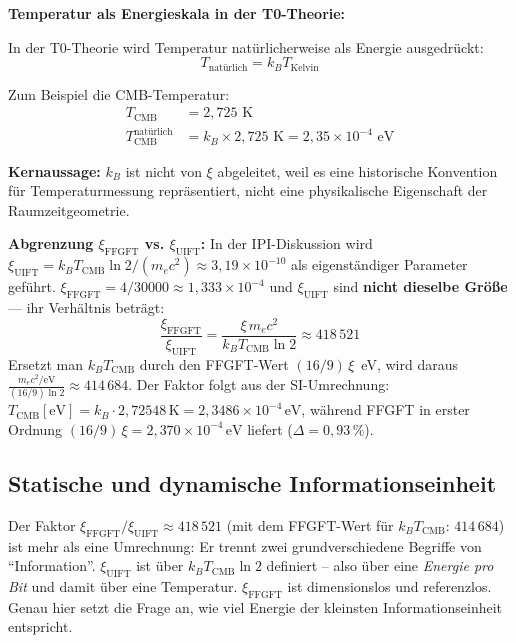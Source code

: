 	\begin{insight}
		\textbf{Temperatur als Energieskala in der T0-Theorie:}
		
		In der T0-Theorie wird Temperatur natürlicherweise als Energie ausgedrückt:
		\begin{equation}
			T_{\text{natürlich}} = k_B T_{\text{Kelvin}}
		\end{equation}
		
		Zum Beispiel die CMB-Temperatur:
		\begin{align}
			T_{\text{CMB}} &= 2{,}725 \text{ K} \\
			T_{\text{CMB}}^{\text{natürlich}} &= k_B \times 2{,}725 \text{ K} = 2{,}35 \times 10^{-4} \text{ eV}
		\end{align}
		
		\textbf{Kernaussage:} $k_B$ ist nicht von $\xi$ abgeleitet, weil es eine historische Konvention für Temperaturmessung repräsentiert, nicht eine physikalische Eigenschaft der Raumzeitgeometrie.

		\textbf{Abgrenzung $\xi_{\text{FFGFT}}$ vs. $\xi_{\text{UIFT}}$:}
		In der IPI-Diskussion wird $\xi_{\text{UIFT}} = k_B T_{\text{CMB}} \ln 2 / (m_e c^2) \approx 3{,}19 \times 10^{-10}$ als eigenständiger Parameter geführt.
		$\xi_{\text{FFGFT}} = 4/30000 \approx 1{,}333 \times 10^{-4}$ und $\xi_{\text{UIFT}}$ sind \textbf{nicht dieselbe Größe} — ihr Verhältnis beträgt:
		\begin{equation}
			\frac{\xi_{\text{FFGFT}}}{\xi_{\text{UIFT}}} = \frac{\xi\, m_e c^2}{k_B T_{\text{CMB}} \ln 2} \approx 418\,521
		\end{equation}
		Ersetzt man $k_B T_{\text{CMB}}$ durch den FFGFT-Wert $(16/9)\,\xi$~eV, wird daraus $\frac{m_e c^2/\text{eV}}{(16/9)\ln 2} \approx 414\,684$.
		Der Faktor folgt aus der SI-Umrechnung: $T_{\text{CMB}}[\text{eV}] = k_B \cdot 2{,}72548\,\text{K} = 2{,}3486 \times 10^{-4}\,\text{eV}$, während FFGFT in erster Ordnung $(16/9)\,\xi = 2{,}370 \times 10^{-4}\,\text{eV}$ liefert ($\Delta = 0{,}93\,\%$).
	\end{insight}

	\subsection{Statische und dynamische Informationseinheit}

	Der Faktor $\xi_{\text{FFGFT}}/\xi_{\text{UIFT}} \approx 418\,521$ (mit dem FFGFT-Wert für $k_B T_{\text{CMB}}$: $414\,684$) ist mehr als
	eine Umrechnung: Er trennt zwei grundverschiedene Begriffe von ``Information''.
	$\xi_{\text{UIFT}}$ ist über $k_B T_{\text{CMB}} \ln 2$ definiert -- also über eine
	\emph{Energie pro Bit} und damit über eine Temperatur. $\xi_{\text{FFGFT}}$ ist
	dimensionslos und referenzlos. Genau hier setzt die Frage an, wie viel Energie der
	kleinsten Informationseinheit entspricht.

